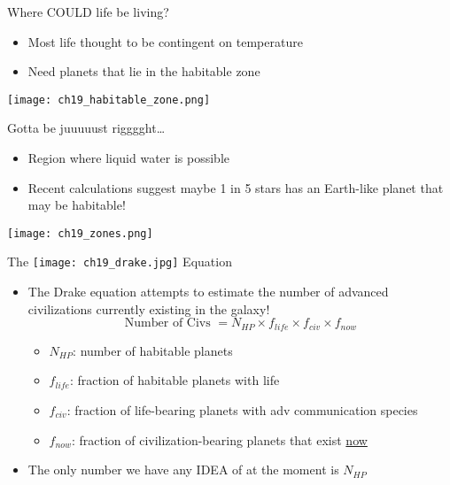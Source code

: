 \documentclass[pdf,aspectratio=169]{beamer}
\begin{document}
\begin{frame}{Where COULD life be living?}
  \begin{itemize}
	\item Most life thought to be contingent on temperature
	\item Need planets that lie in the \alert{habitable zone}
  \end{itemize}
  \begin{center}
	\texttt{[image: ch19\_habitable\_zone.png]}
  \end{center}
\end{frame}

\begin{frame}{Gotta be juuuuust rigggght\ldots}
	\begin{itemize}
	  \item Region where liquid water is possible
	  \item Recent calculations suggest maybe 1 in 5 stars has an Earth-like planet that may be habitable!
	\end{itemize}
	\begin{center}
	  \texttt{[image: ch19\_zones.png]}
	\end{center}
\end{frame}

\begin{frame}{The \texttt{[image: ch19\_drake.jpg]} \hspace{3pt}Equation}
  \begin{itemize}
	\item The Drake equation attempts to estimate the number of advanced civilizations currently existing in the galaxy!
	  \[\text{Number of Civs }=N_{HP}\times f_{life} \times f_{civ} \times f_{now}\]
	  \vspace{-6mm}
	  \begin{itemize}
		\item $N_{HP}$: number of habitable planets
		\item $f_{life}$: fraction of habitable planets with life
		\item $f_{civ}$: fraction of life-bearing planets with adv communication species
		\item $f_{now}$: fraction of civilization-bearing planets that exist \underline{now}
	  \end{itemize}
	\item The only number we have any IDEA of at the moment is $N_{HP}$
  \end{itemize}
\end{frame}
\end{document}
